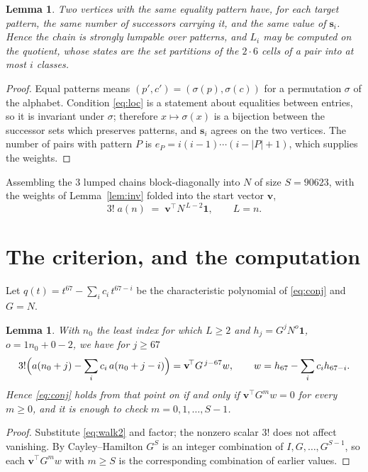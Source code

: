 \documentclass[11pt,a4paper]{article}
\theoremstyle{plain}
\newtheorem{lemma}[theorem]{Lemma}
\theoremstyle{definition}
\begin{document}
\begin{lemma}\label{lem:lump}
Two vertices with the same equality pattern have, for each target pattern, the same number of
successors carrying it, and the same value of $\mathbf{s}_i$. Hence the chain is strongly
lumpable over patterns, and $L_i$ may be computed on the quotient, whose states are the set
partitions of the $2\cdot6$ cells of a pair into at most $i$ classes.
\end{lemma}

\begin{proof}
Equal patterns means $(p',c')=(\sigma(p),\sigma(c))$ for a permutation $\sigma$ of the
alphabet. Condition \eqref{eq:loc} is a statement about equalities between entries, so it is
invariant under $\sigma$; therefore $x\mapsto\sigma(x)$ is a bijection between the successor
sets which preserves patterns, and $\mathbf{s}_i$ agrees on the two vertices. The number of
pairs with pattern $P$ is $e_P=i(i-1)\cdots(i-|P|+1)$, which supplies the weights.
\end{proof}

Assembling the $3$ lumped chains block-diagonally into $N$ of size $S=90623$, with the
weights of Lemma~\ref{lem:inv} folded into the start vector $\mathbf{v}$,
\begin{equation}\label{eq:walk2}
3!\;a(n)\;=\;\mathbf{v}^{\!\top}N^{\,L-2}\mathbf{1},\qquad L=n .
\end{equation}

\section{The criterion, and the computation}

Let $q(t)=t^{67}-\sum_i c_i\,t^{67-i}$ be the characteristic polynomial of
\eqref{eq:conj} and $G=N$.

\begin{lemma}\label{lem:crit}
With $n_0$ the least index for which $L\ge2$ and $h_j=G^{j}N^{o}\mathbf{1}$,
$o=1n_0+0-2$, we have for $j\ge67$
\[
3!\Bigl(a(n_0+j)-\sum_i c_i\,a(n_0+j-i)\Bigr)
=\mathbf{v}^{\!\top}G^{\,j-67}w,\qquad
w=h_{67}-\sum_i c_i h_{67-i} .
\]
Hence \eqref{eq:conj} holds from that point on if and only if
$\mathbf{v}^{\!\top}G^{m}w=0$ for every $m\ge0$, and it is enough to check
$m=0,1,\dots,S-1$.
\end{lemma}

\begin{proof}
Substitute \eqref{eq:walk2} and factor; the nonzero scalar $3!$ does not affect
vanishing. By Cayley--Hamilton $G^{S}$ is an integer combination of $I,G,\dots,G^{S-1}$,
so each $\mathbf{v}^{\!\top}G^{m}w$ with $m\ge S$ is the corresponding combination of
earlier values.
\end{proof}
\end{document}
